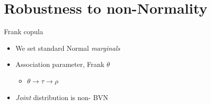 \documentclass[10pt]{beamer}
\providecommand{\tightlist}{%
\setlength{\itemsep}{0pt}\setlength{\parskip}{0pt}}
\begin{document}
\hypertarget{robustness-to-non-normality}{%
\section{Robustness to non-Normality}\label{robustness-to-non-normality}}

\begin{frame}{Frank copula}
\protect\hypertarget{frank-copula}{}

\begin{itemize}
\tightlist
\item
  We set standard Normal \emph{marginals}
\item
  Association parameter, Frank \(\theta\)

  \begin{itemize}
  \tightlist
  \item
    \(\theta \rightarrow \tau \rightarrow \rho\)
  \end{itemize}
\item
  \emph{Joint} distribution is \alert{non-} BVN
\end{itemize}

\end{frame}
\end{document}
